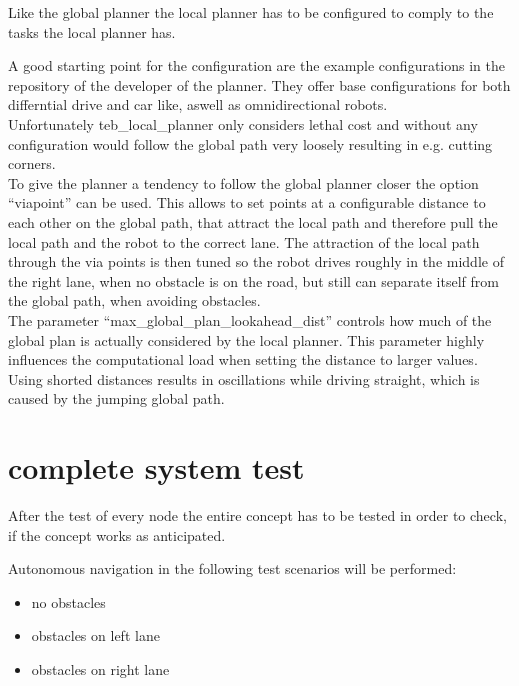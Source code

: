 Like the global planner the local planner has to be configured to comply to the tasks the local planner has.

A good starting point for the configuration are the example configurations in the repository of the developer of the planner\cite{tebtutorials}. They offer base configurations for both differntial drive and car like, aswell as omnidirectional robots.\\

Unfortunately teb\_local\_planner only considers lethal cost and without any configuration would follow the global path very loosely resulting in e.g. cutting corners.\\ 

To give the planner a tendency to follow the global planner closer the option ``viapoint'' can be used. This allows to set points at a configurable distance to each other on the global path, that attract the local path and therefore pull the local path and the robot to the correct lane. The attraction of the local path through the via points is then tuned so the robot drives roughly in the middle of the right lane, when no obstacle is on the road, but still can separate itself from the global path, when avoiding obstacles.\\

The parameter ``max\_global\_plan\_lookahead\_dist'' controls how much of the global plan is actually considered by the local planner. This parameter highly influences the computational load when setting the distance to larger values. Using shorted distances results in oscillations while driving straight, which is caused by the jumping global path.


\section{complete system test}

After the test of every node the entire concept has to be tested in order to check, if the concept works as anticipated.

Autonomous navigation in the following test scenarios will be performed:

\begin{itemize}
	\item no obstacles
	\item obstacles on left lane
	\item obstacles on right lane
\end{itemize}

